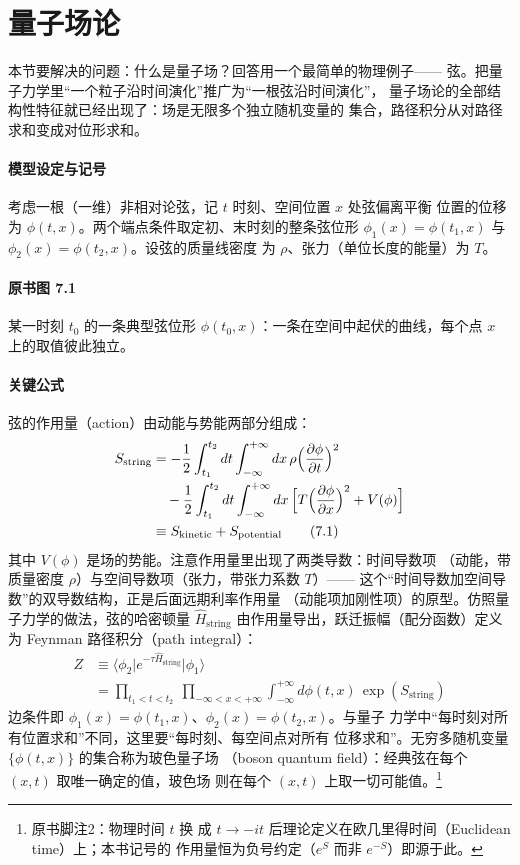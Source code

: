 \section{量子场论}

本节要解决的问题：什么是量子场？回答用一个最简单的物理例子——
弦。把量子力学里“一个粒子沿时间演化”推广为“一根弦沿时间演化”，
量子场论的全部结构性特征就已经出现了：场是无限多个独立随机变量的
集合，路径积分从对路径求和变成对位形求和。

\paragraph{模型设定与记号}
考虑一根（一维）非相对论弦，记 $t$ 时刻、空间位置 $x$ 处弦偏离平衡
位置的位移为 $\phi(t,x)$。两个端点条件取定初、末时刻的整条弦位形
$\phi_1(x)=\phi(t_1,x)$ 与 $\phi_2(x)=\phi(t_2,x)$。设弦的质量线密度
为 $\rho$、张力（单位长度的能量）为 $T$。

\paragraph{原书图 7.1}\quad 某一时刻 $t_0$ 的一条典型弦位形
$\phi(t_0,x)$：一条在空间中起伏的曲线，每个点 $x$ 上的取值彼此独立。

\paragraph{关键公式}
弦的作用量（action）由动能与势能两部分组成：
\begin{align*}
S_{\mathrm{string}}&=-\frac{1}{2}\int_{t_1}^{t_2}dt\int_{-\infty}^{+\infty}dx\,
\rho\Bigl(\frac{\partial\phi}{\partial t}\Bigr)^{2}\\
&\quad-\frac{1}{2}\int_{t_1}^{t_2}dt\int_{-\infty}^{+\infty}dx\,
\Bigl[T\Bigl(\frac{\partial\phi}{\partial x}\Bigr)^{2}+V(\phi)\Bigr]\\
&\equiv S_{\mathrm{kinetic}}+S_{\mathrm{potential}}
\tag{7.1}
\end{align*}
其中 $V(\phi)$ 是场的势能。注意作用量里出现了两类导数：时间导数项
（动能，带质量密度 $\rho$）与空间导数项（张力，带张力系数 $T$）——
这个“时间导数加空间导数”的双导数结构，正是后面远期利率作用量
（动能项加刚性项）的原型。仿照量子力学的做法，弦的哈密顿量
$\hat{H}_{\mathrm{string}}$ 由作用量导出，跃迁振幅（配分函数）定义为
Feynman 路径积分（path integral）：
\begin{align*}
Z&\equiv\langle\phi_2\vert e^{-\tau\hat{H}_{\mathrm{string}}}\vert\phi_1\rangle
\tag{7.2}\\
&=\prod_{t_1<t<t_2}\ \prod_{-\infty<x<+\infty}\int_{-\infty}^{+\infty}
d\phi(t,x)\,\exp(S_{\mathrm{string}})
\tag{7.3}
\end{align*}
边条件即 $\phi_1(x)=\phi(t_1,x)$、$\phi_2(x)=\phi(t_2,x)$。与量子
力学中“每时刻对所有位置求和”不同，这里要“每时刻、每空间点对所有
位移求和”。无穷多随机变量 $\{\phi(t,x)\}$ 的集合称为玻色量子场
（boson quantum field）：经典弦在每个 $(x,t)$ 取唯一确定的值，玻色场
则在每个 $(x,t)$ 上取一切可能值。\footnote{原书脚注2：物理时间 $t$ 换
成 $t\to-it$ 后理论定义在欧几里得时间（Euclidean time）上；本书记号的
作用量恒为负号约定（$e^{S}$ 而非 $e^{-S}$）即源于此。}

